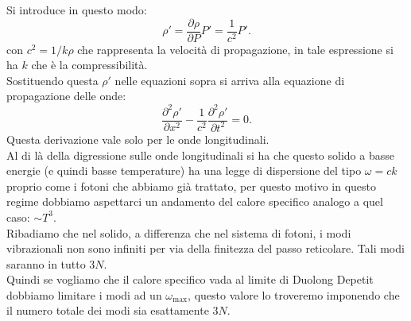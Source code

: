 Si introduce in questo modo:
\[
	\rho'
	= 
	\frac{\partial \rho }{\partial P} P' 
	=
	\frac{1}{c^2} P'
.\] 
con $c^2 = 1 / k\rho $ che rappresenta la velocità di propagazione, in tale espressione si ha $k$ che è la compressibilità. \\
Sostituendo questa $\rho '$ nelle equazioni sopra si arriva alla equazione di propagazione delle onde:
\[
	\frac{\partial ^2 \rho '}{\partial x^2} - 
	\frac{1}{c^2} \frac{\partial ^2\rho '}{\partial t^2} 
	= 
	0
.\] 
Questa derivazione vale solo per le onde longitudinali.\\
Al di là della digressione sulle onde longitudinali si ha che questo solido a basse energie (e quindi basse temperature) ha una legge di dispersione del tipo  $\omega = c k$ proprio come i fotoni che abbiamo già trattato, per questo motivo in questo regime dobbiamo aspettarci un andamento del calore specifico analogo a quel caso: $\sim T^3$.\\
Ribadiamo che nel solido, a differenza che nel sistema di fotoni, i modi vibrazionali non sono infiniti per via della finitezza del passo reticolare. Tali modi saranno in tutto $3N$.\\
Quindi se vogliamo che il calore specifico vada al limite di Duolong Depetit dobbiamo limitare i modi ad un $\omega _{\text{max}}$, questo valore lo troveremo imponendo che il numero totale dei modi sia esattamente $3N$.
